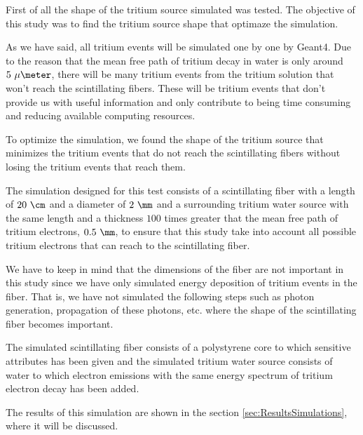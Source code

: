 First of all the shape of the tritium source simulated was tested. The objective of this study was to find the tritium source shape that optimaze the simulation. 

As we have said, all tritium events will be simulated one by one by Geant4. Due to the reason that the mean free path of tritium decay in water is only around $5~\mu\meter$, there will be many tritium events from the tritium solution that won't reach the scintillating fibers. These will be tritium events that don't provide us with useful information and only contribute to being time consuming and reducing available computing resources.

To optimize the simulation, we found the shape of the tritium source that minimizes the tritium events that do not reach the scintillating fibers without losing the tritium events that reach them.

The simulation designed for this test consists of a scintillating fiber with a length of $20~\cm$ and a diameter of $2~\mm$ and a surrounding tritium water source with the same length and a thickness $100$ times greater that the mean free path of tritium electrons, $0.5~\mm$, to ensure that this study take into account all possible tritium electrons that can reach to the scintillating fiber. 

We have to keep in mind that the dimensions of the fiber are not important in this study since we have only simulated energy deposition of tritium events in the fiber. That is, we have not simulated the following steps such as photon generation, propagation of these photons, etc. where the shape of the scintillating fiber becomes important.

The simulated scintillating fiber consists of a polystyrene core to which sensitive attributes has been given and the simulated tritium water source consists of water to which electron emissions with the same energy spectrum of tritium electron decay has been added.

The results of this simulation are shown in the section \ref{sec:ResultsSimulations}, where it will be discussed.
